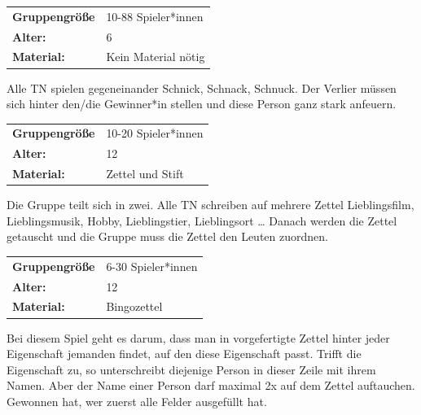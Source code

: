
\begin{table}[H]
\begin{tabular}{>{\bfseries}lp{8cm}}
  Gruppengröße   & 10-88 Spieler*innen\\
    Alter: & 6 \\
    Material: & Kein Material nötig\\
\end{tabular}
\end{table} 
Alle TN spielen gegeneinander Schnick, Schnack, Schnuck. Der Verlier müssen sich hinter den/die Gewinner*in stellen und diese Person ganz stark anfeuern.  \\

\newpage
\begin{table}[H]
\begin{tabular}{>{\bfseries}lp{8cm}}
   Gruppengröße   & 10-20 Spieler*innen\\
    Alter: & 12 \\
    Material: &Zettel und Stift \\
\end{tabular}
\end{table} 

Die Gruppe teilt sich in zwei. Alle TN schreiben auf mehrere Zettel Lieblingsfilm, Lieblingsmusik, Hobby, Lieblingstier, Lieblingsort … Danach werden die Zettel getauscht und die Gruppe muss die Zettel den Leuten zuordnen. \\



\begin{table}[H]
\begin{tabular}{>{\bfseries}lp{8cm}}
   Gruppengröße   & 6-30 Spieler*innen\\
    Alter: & 12 \\
    Material: & Bingozettel \\
\end{tabular}
\end{table} 
 Bei diesem Spiel geht es darum, dass man in vorgefertigte Zettel hinter jeder Eigenschaft jemanden findet, auf den diese Eigenschaft passt. Trifft die Eigenschaft zu, so unterschreibt diejenige Person in dieser Zeile mit ihrem Namen. Aber der Name einer Person darf maximal 2x auf dem Zettel auftauchen. Gewonnen hat, wer zuerst alle Felder ausgefüllt hat.\\



